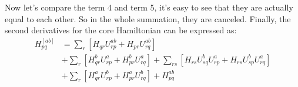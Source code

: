 Now let's compare the term 4 and term 5, it's easy to see that they are
actually equal to each other. So in the whole summation, they are canceled.
Finally, the second derivatives for the core Hamiltonian can be expressed as:
\begin{align}
  \label{core_Hamiltonian_MO_INT_gradient_eq:6}
H_{pq}^{[ab]} &= \sum_{r}\left[ H_{qr} U^{ab}_{rp} + H_{pr}U^{ab}_{rq}\right]
\nonumber \\
&+ \sum_{r}\left[  H^{b}_{qr}U^{a}_{rp} + H^{b}_{pr}U^{a}_{rq}\right]  + 
\sum_{rs}\left[ H_{rs}U^{b}_{sq}U^{a}_{rp} +
H_{rs}U^{b}_{sp}U^{a}_{rq}\right] \nonumber \\
&+ \sum_{r}\left[H^{a}_{qr}U^{b}_{rp} + H^{a}_{pr}U^{b}_{rq}\right]  +
H^{ab}_{pq}
\end{align}

